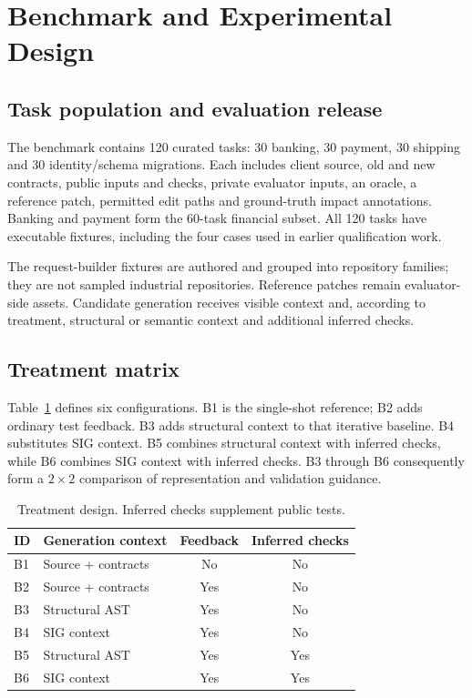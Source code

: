 \section{Benchmark and Experimental Design}
\subsection{Task population and evaluation release}
The benchmark contains 120 curated tasks: 30 banking, 30 payment, 30 shipping and 30 identity/schema migrations. Each includes client source, old and new contracts, public inputs and checks, private evaluator inputs, an oracle, a reference patch, permitted edit paths and ground-truth impact annotations. Banking and payment form the 60-task financial subset. All 120 tasks have executable fixtures, including the four cases used in earlier qualification work.

The request-builder fixtures are authored and grouped into repository families; they are not sampled industrial repositories. Reference patches remain evaluator-side assets. Candidate generation receives visible context and, according to treatment, structural or semantic context and additional inferred checks.

\subsection{Treatment matrix}
Table~\ref{tab:treatments} defines six configurations. B1 is the single-shot reference; B2 adds ordinary test feedback. B3 adds structural context to that iterative baseline. B4 substitutes SIG context. B5 combines structural context with inferred checks, while B6 combines SIG context with inferred checks. B3 through B6 consequently form a $2\times2$ comparison of representation and validation guidance.

\begin{table}[t]\centering\small
\caption{Treatment design. Inferred checks supplement public tests.}\label{tab:treatments}
\begin{tabularx}{\columnwidth}{@{}lXcc@{}}\toprule
ID & Generation context & Feedback & Inferred checks\\\midrule
B1 & Source + contracts & No & No\\
B2 & Source + contracts & Yes & No\\
B3 & Structural AST & Yes & No\\
B4 & SIG context & Yes & No\\
B5 & Structural AST & Yes & Yes\\
B6 & SIG context & Yes & Yes\\\bottomrule
\end{tabularx}
\end{table}

